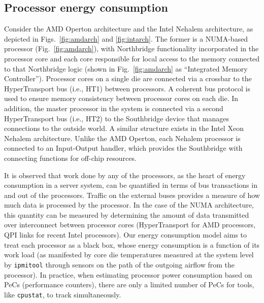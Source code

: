 \documentclass[acmtaco]{acmtrans2m}
\newcommand{\figurenames}{Figs.}
\newcommand{\figurename}{Fig.}
\begin{document}
\subsection{Processor energy consumption}
\label{sec:procmodel}
Consider the AMD Operton architecture and the Intel Nehalem
architecture, as depicted in \figurenames~\ref{fig:amdarch} and
\ref{fig:intarch}.  The former is a NUMA-based processor
(\figurename~\ref{fig:amdarch}), with Northbridge functionality
incorporated in the processor core and each core responsible for local
access to the memory connected to that Northbridge logic (shown in
\figurename~\ref{fig:amdarch} as ``Integrated Memory Controller'').
Processor cores on a single die are connected via a crossbar to the
HyperTransport bus (i.e., HT1) between processors.  A coherent bus
protocol is used to ensure memory consistency between processor cores on
each die.  In addition, the master processor in the system is connected
via a second HyperTransport bus (i.e., HT2) to the Southbridge device
that manages connections to the outside world.  A similar structure
exists in the Intel Xeon Nehalem architecture.  Unlike the AMD Operton,
each Nehalem processor is connected to an Input-Output handler, which
provides the Southbridge with connecting functions for off-chip resources.

It is observed that work done by any of the processors, as the heart of
energy consumption in a server system, can be quantified in terms of bus
transactions in and out of the processors.  Traffic on the external
buses provides a measure of how much data is processed by the processor.
In the case of the NUMA architecture, this quantity can be measured by
determining the amount of data transmitted over interconnect between
processor cores (HyperTransport for AMD processors, QPI links for recent
Intel processors). Our energy consumption model aims to treat each
processor as a black box, whose energy consumption is a function of its
work load (as manifested by core die temperatures measured at the system
level by \texttt{ipmitool} through sensors on the path of the outgoing
airflow from the processor).  In practice, when estimating processor
power consumption based on PeCs (performance counters), there are only a
limited number of PeCs for tools, like \texttt{cpustat}, to track
simultaneously.
\end{document}

